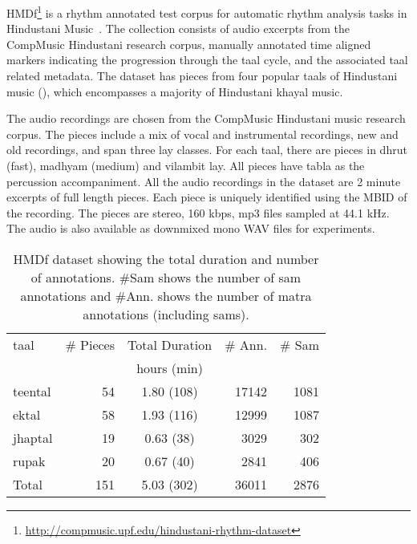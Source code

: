 \acrfull{HMDf}\footnote{\url{http://compmusic.upf.edu/hindustani-rhythm-dataset}} is a rhythm annotated test corpus for automatic rhythm analysis tasks in Hindustani Music~\cite{ajay:16:spmodel}. The collection consists of audio excerpts from the CompMusic Hindustani research corpus, manually annotated time aligned markers indicating the progression through the \gls{taal} cycle, and the associated \gls{taal} related metadata. The dataset has pieces from four popular \glspl{taal} of Hindustani music (), which encompasses a majority of Hindustani \gls{khayal} music. 

The audio recordings are chosen from the CompMusic Hindustani music research corpus. The pieces include a mix of vocal and instrumental recordings, new and old recordings, and span three \gls{lay} classes. For each taal, there are pieces in \gls{dhrut} (fast), \gls{madhyam} (medium) and \gls{vilambit} \gls{lay}. All pieces have \gls{tabla} as the percussion accompaniment. All the audio recordings in the dataset are 2 minute excerpts of full length pieces. Each piece is uniquely identified using the \gls{MBID} of the recording. The pieces are stereo, 160 kbps, mp3 files sampled at 44.1 kHz. The audio is also available as downmixed mono WAV files for experiments. 
\begin{table}[t]
\begin{center}
\begin{tabular}{@{}lrcrr@{}}
\toprule 
\Gls{taal} & \# Pieces & Total Duration & \# Ann. & \# Sam\tabularnewline
 &  & hours (min) &  & \tabularnewline
\midrule 
\Gls{teental} & 54 & 1.80 (108) & 17142 & 1081\tabularnewline
\Gls{ektal} & 58 & 1.93 (116) & 12999 & 1087\tabularnewline
\Gls{jhaptal} & 19 & 0.63 (38) & 3029 & 302\tabularnewline
\Gls{rupak} & 20 & 0.67 (40) & 2841 & 406\tabularnewline
\midrule 
Total & 151 & 5.03 (302) & 36011 & 2876\tabularnewline
\bottomrule 
\end{tabular}
\end{center}
\protect\caption[\acrshort{HMDf} dataset description]{\acrshort{HMDf} dataset showing the total duration and number of annotations. \#Sam shows the number of \gls{sam} annotations and \#Ann. shows the number of \gls{matra} annotations (including \glspl{sam}).}
\label{tab:dataset:hmdf}
\end{table}
